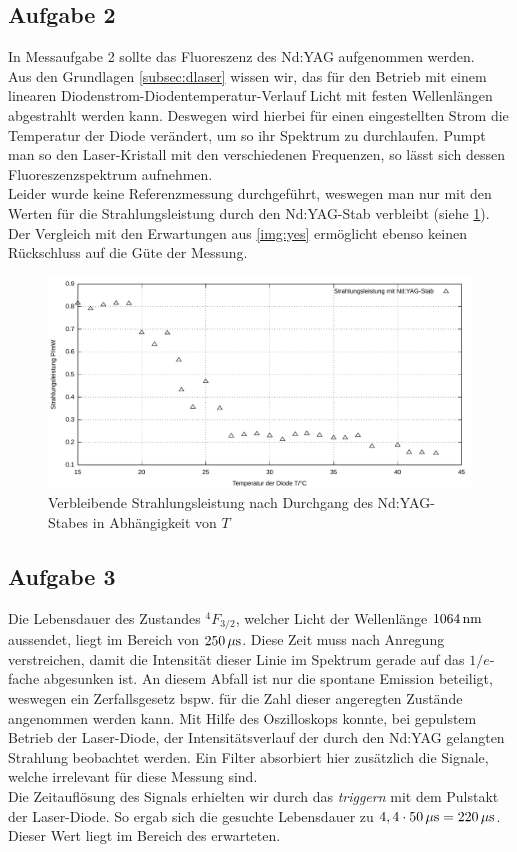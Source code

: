 \documentclass[numbers=noenddot,12pt,a4paper]{scrartcl}
\newcommand{\tilt}[1]{\mbox{\textit{#1}}}
\begin{document}
\subsection{Aufgabe 2}
In Messaufgabe 2 sollte das Fluoreszenz des Nd:YAG aufgenommen werden.\\
Aus den Grundlagen \ref{subsec:dlaser} wissen wir, das für den Betrieb mit einem linearen Diodenstrom-Diodentemperatur-Verlauf Licht mit festen Wellenlängen abgestrahlt werden kann. Deswegen wird hierbei für einen eingestellten Strom die Temperatur der Diode verändert, um so ihr Spektrum zu durchlaufen. Pumpt man so den Laser-Kristall mit den verschiedenen Frequenzen, so lässt sich dessen Fluoreszenzspektrum aufnehmen.\\
Leider wurde keine Referenzmessung durchgeführt, weswegen man nur mit den Werten für die Strahlungsleistung durch den Nd:YAG-Stab verbleibt (siehe \ref{img:shit}). Der Vergleich mit den Erwartungen aus \ref{img:yes} ermöglicht ebenso keinen Rückschluss auf die Güte der Messung.
\begin{figure}[H]
	\centering
	\includegraphics[width=\textwidth]{messwerte/fluoreszenz.pdf}
	\caption{Verbleibende Strahlungsleistung nach Durchgang des Nd:YAG-Stabes in Abhängigkeit von $T$}\label{img:shit}
\end{figure}
\subsection{Aufgabe 3}
Die Lebensdauer des Zustandes $^{4}F_{3/2}$, welcher Licht der Wellenlänge $\unit[1064]{nm}$ aussendet, liegt im Bereich von $\unit[250]{\mu s}$. Diese Zeit muss nach Anregung verstreichen, damit die Intensität dieser Linie im Spektrum gerade auf das $1/e$-fache abgesunken ist. An diesem Abfall ist nur die spontane Emission beteiligt, weswegen ein Zerfallsgesetz bspw. für die Zahl dieser angeregten Zustände angenommen werden kann. Mit Hilfe des Oszilloskops konnte, bei gepulstem Betrieb der Laser-Diode, der Intensitätsverlauf der durch den Nd:YAG gelangten Strahlung beobachtet werden. Ein Filter absorbiert hier zusätzlich die Signale, welche irrelevant für diese Messung sind.\\
Die Zeitauflösung des Signals erhielten wir durch das \tilt{triggern} mit dem Pulstakt der Laser-Diode. So ergab sich die gesuchte Lebensdauer zu $4,4\cdot\unit[50]{\mu s}=\unit[220]{\mu s}$. Dieser Wert liegt im Bereich des erwarteten.
\end{document}
